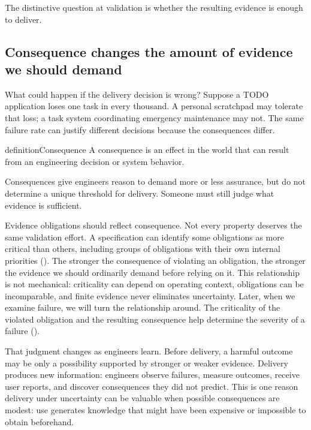 The distinctive question at validation is whether the resulting evidence is enough to deliver.

\subsection{Consequence changes the amount of evidence we should demand}\label{sec-consequence-evidence}

What could happen if the delivery decision is wrong? Suppose a TODO application loses one task in
every thousand. A personal scratchpad may tolerate that loss; a task system coordinating emergency
maintenance may not. The same failure rate can justify different decisions because the consequences
differ.

\begin{bookbox}{definition}{Consequence} %
A consequence is an effect in the world that can result from an engineering decision or system
behavior.
\end{bookbox}

Consequences give engineers reason to demand more or less assurance, but do not determine a unique
threshold for delivery. Someone must still judge what evidence is sufficient.

Evidence obligations should reflect consequence. Not every property deserves the same validation
effort. A specification can identify some obligations as more critical than others, including
groups of obligations with their own internal priorities (\citet{sec-prioritizing-effort}). The stronger
the consequence of violating an obligation, the stronger the evidence we should ordinarily demand
before relying on it. This relationship is not mechanical: criticality can depend on operating
context, obligations can be incomparable, and finite evidence never eliminates uncertainty. Later,
when we examine failure, we will turn the relationship around. The criticality of the violated
obligation and the resulting consequence help determine the severity of a failure
(\citet{ch-failure-aware-engineering}).

That judgment changes as engineers learn. Before delivery, a harmful outcome may be only a
possibility supported by stronger or weaker evidence. Delivery produces new information: engineers
observe failures, measure outcomes, receive user reports, and discover consequences they did not
predict. This is one reason delivery under uncertainty can be valuable when possible consequences
are modest: use generates knowledge that might have been expensive or impossible to obtain
beforehand.

